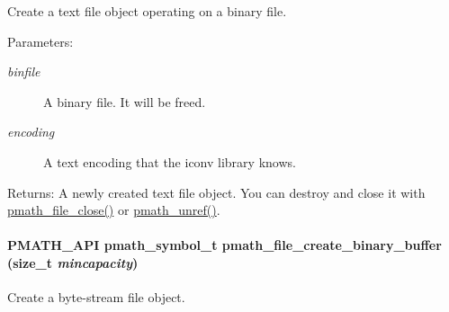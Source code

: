Create a text file object operating on a binary file. 

\begin{Desc}
\item[Parameters:]
\begin{description}
\item[{\em binfile}]A binary file. It will be freed. \item[{\em encoding}]A text encoding that the iconv library knows. \end{description}
\end{Desc}
\begin{Desc}
\item[Returns:]A newly created text file object. You can destroy and close it with \hyperlink{group__file__api_g61142920bd7a8f066af908092c84d8e4}{pmath\_\-file\_\-close()} or \hyperlink{classpmath__t_54e905402c38940687033b87eb8c6c9f}{pmath\_\-unref()}. \end{Desc}
\hypertarget{group__file__api_g811d829fe964ebbe554c645a0f0f519d}{
\paragraph[{pmath\_\-file\_\-create\_\-binary\_\-buffer}]{\setlength{\rightskip}{0pt plus 5cm}PMATH\_\-API {\bf pmath\_\-symbol\_\-t} pmath\_\-file\_\-create\_\-binary\_\-buffer (size\_\-t {\em mincapacity})}\hfill}
\label{group__file__api_g811d829fe964ebbe554c645a0f0f519d}


Create a byte-stream file object. 

